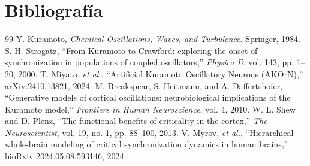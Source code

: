 \documentclass[12pt]{article}
\begin{document}
\section{Bibliografía}
\begin{thebibliography}{99}
 Y. Kuramoto, \textit{Chemical Oscillations, Waves, and Turbulence}. Springer, 1984.
 S. H. Strogatz, “From Kuramoto to Crawford: exploring the onset of synchronization in populations of coupled oscillators,” \textit{Physica D}, vol. 143, pp. 1–20, 2000.
 T. Miyato, \textit{et al.}, “Artificial Kuramoto Oscillatory Neurons (AKOrN),” arXiv:2410.13821, 2024.
 M. Breakspear, S. Heitmann, and A. Daffertshofer, “Generative models of cortical oscillations: neurobiological implications of the Kuramoto model,” \textit{Frontiers in Human Neuroscience}, vol. 4, 2010.
 W. L. Shew and D. Plenz, “The functional benefits of criticality in the cortex,” \textit{The Neuroscientist}, vol. 19, no. 1, pp. 88–100, 2013.
 V. Myrov, \textit{et al.}, “Hierarchical whole-brain modeling of critical synchronization dynamics in human brains,” bioRxiv 2024.05.08.593146, 2024.
\end{thebibliography}
\end{document}
